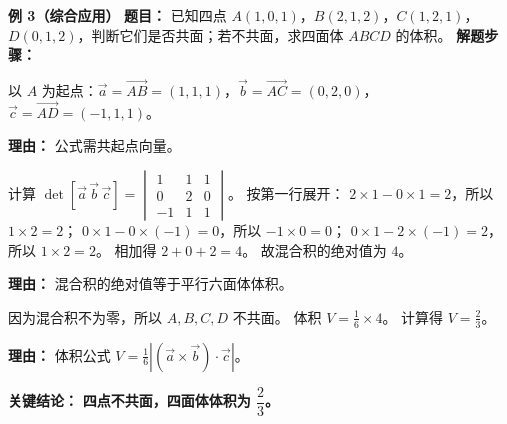 \begin{examplebox}
	\medskip
	\textbf{\textcolor{CExample}{例 3（综合应用）}}
	\textbf{\textcolor{CExample}{题目：}}
	已知四点 $A(1,0,1)$，$B(2,1,2)$，$C(1,2,1)$，$D(0,1,2)$，判断它们是否共面；若不共面，求四面体 $ABCD$ 的体积。
	\textbf{\textcolor{CExample}{解题步骤：}}
	\begin{description}[style=nextline, leftmargin=2.8em, labelsep=0.5em, itemsep=0.45em]
		\item[\textbf{第一步（作差求向量）：}]
			以 $A$ 为起点：$\vec{a}=\overrightarrow{AB}=(1,1,1)$，$\vec{b}=\overrightarrow{AC}=(0,2,0)$，$\vec{c}=\overrightarrow{AD}=(-1,1,1)$。
			\par\textbf{理由：} 公式需共起点向量。
		\item[\textbf{第二步（计算混合积）：}]
			计算 $\det[\vec{a}\,\vec{b}\,\vec{c}] =
			\begin{vmatrix}
				1&1&1\\0&2&0\\-1&1&1
		\end{vmatrix}
			$。 按第一行展开： $2\times1-0\times1 = 2$，所以 $1\times2 = 2$； $0\times1-0\times(-1) = 0$，所以 $-1\times0 = 0$； $0\times1-2\times(-1) = 2$，所以 $1\times2 = 2$。 相加得 $2+0+2 = 4$。 故混合积的绝对值为 $4$。
			\par\textbf{理由：} 混合积的绝对值等于平行六面体体积。
		\item[\textbf{第三步（判断与求积）：}]
			因为混合积不为零，所以 $A,B,C,D$ 不共面。 体积 $V = \frac16 \times 4$。 计算得 $V = \frac23$。
			\par\textbf{理由：} 体积公式 $V=\frac16|(\vec{a}\times\vec{b})\cdot\vec{c}|$。
	\end{description}
	\textbf{\textcolor{CExample}{关键结论：}}
	\textbf{四点不共面，四面体体积为 $\dfrac23$。}
\end{examplebox}
